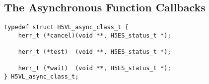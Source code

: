 \subsection{The Asynchronous Function Callbacks}

\begin{lstlisting}
typedef struct H5VL_async_class_t {
    herr_t (*cancel)(void **, H5ES_status_t *);

    herr_t (*test)  (void **, H5ES_status_t *);

    herr_t (*wait)  (void **, H5ES_status_t *);
} H5VL_async_class_t;
\end{lstlisting}

